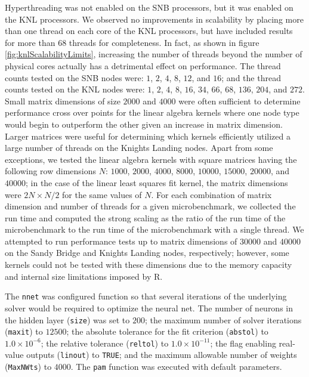 Hyperthreading was not enabled on the SNB processors, but it was enabled on the KNL
processors. We observed no improvements in scalability by placing more than one thread on
each core of the KNL processors, but have included results for more than 68 threads for
completeness. In fact, as shown in figure \ref{fig:knlScalabilityLimits}, increasing the
number of threads beyond the number of physical cores actually has a detrimental effect on
performance. The thread counts tested on the SNB nodes were: $1$, $2$, $4$, $8$, $12$, and
$16$; and the thread counts tested on the KNL nodes were: $1$, $2$, $4$, $8$, $16$, $34$,
$66$, $68$, $136$, $204$, and $272$. Small matrix dimensions of size $2000$ and $4000$
were often sufficient to determine performance cross over points for the linear algebra
kernels where one node type would begin to outperform the other given an increase in
matrix dimension. Larger matrices were useful for determining which kernels efficiently
utilized a large number of threads on the Knights Landing nodes. Apart from some
exceptions, we tested the linear algebra kernels with square matrices having the following
row dimensions $N$: $1000$, $2000$, $4000$, $8000$, $10000$, $15000$, $20000$, and
$40000$; in the case of the linear least squares fit kernel, the matrix dimensions were
$2N \times N/2$ for the same values of $N$. For each combination of matrix dimension and
number of threads for a given microbenchmark, we collected the run time and computed the
strong scaling as the ratio of the run time of the microbenchmark to the run time of the
microbenchmark with a single thread. We attempted to run performance tests up to matrix
dimensions of $30000$ and $40000$ on the Sandy Bridge and Knights Landing nodes,
respectively; however, some kernels could not be tested with these dimensions due to the
memory capacity and internal size limitations imposed by R.

The \texttt{nnet} was configured function so that several iterations of the underlying
solver would be required to optimize the neural net. The number of neurons in the hidden
layer (\texttt{size}) was set to $200$; the maximum number of solver iterations
(\texttt{maxit}) to $12500$; the absolute tolerance for the fit criterion
(\texttt{abstol}) to $1.0\times 10^{-6}$; the relative tolerance (\texttt{reltol}) to
$1.0\times 10^{-11}$; the flag enabling real-value outputs (\texttt{linout}) to
\texttt{TRUE}; and the maximum allowable number of weights (\texttt{MaxNWts}) to $4000$.
The \texttt{pam} function was executed with default parameters.


